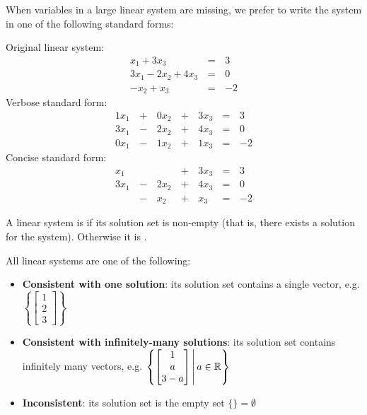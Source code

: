 \begin{applicationActivities}
\begin{remark}
  When variables in a large linear system are missing, we prefer to
  write the system in one of the following standard forms:

  \begin{multicols}{3}\noindent
    Original linear system:
    \begin{alignat*}{2}
       x_1 + 3x_3 &\,=\,& 3 \\
      3x_1 - 2x_2 + 4x_3 &\,=\,& 0 \\
      -x_2 +  x_3 &\,=\,& -2
    \end{alignat*}
    Verbose standard form:
    \begin{alignat*}{4}
      1x_1 &\,+\,& 0x_2 &\,+\,& 3x_3 &\,=\,& 3 \\
      3x_1 &\,-\,& 2x_2 &\,+\,& 4x_3 &\,=\,& 0 \\
      0x_1 &\,-\,& 1x_2 &\,+\,& 1x_3 &\,=\,& -2
    \end{alignat*}
    Concise standard form:
    \begin{alignat*}{4}
       x_1 &     &      &\,+\,& 3x_3 &\,=\,& 3 \\
      3x_1 &\,-\,& 2x_2 &\,+\,& 4x_3 &\,=\,& 0 \\
           &\,-\,&  x_2 &\,+\,&  x_3 &\,=\,& -2
    \end{alignat*}
  \end{multicols}
\end{remark}

\begin{definition}
  A linear system is  if its solution set
  is non-empty (that is, there exists a solution for the
  system). Otherwise it is .
\end{definition}

\begin{fact}
  All linear systems are one of the following:
  \begin{itemize}
    \item \textbf{Consistent with one solution}:
          its solution set contains a single vector, e.g.
          \(\left\{\begin{bmatrix}1\\2\\3\end{bmatrix}\right\}\)
    \item \textbf{Consistent with infinitely-many solutions}:
          its solution set contains infinitely many vectors, e.g.
          \(
            \left\{
              \begin{bmatrix}1\\a\\3-a\end{bmatrix}
            \,\middle|\,
              a\in\mathbb{R}
            \right\}
          \)
    \item \textbf{Inconsistent}:
          its solution set is the empty set \(\{\}=\emptyset\)
  \end{itemize}
\end{fact}


\end{applicationActivities}

